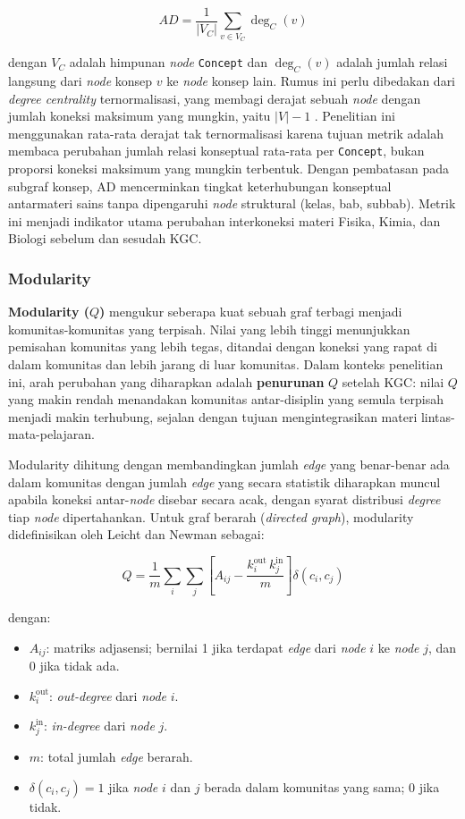 \documentclass[../../thesis]{subfiles}
\begin{document}
\[
  AD = \frac{1}{|V_C|} \sum_{v \in V_C} \deg_C(v)
\]

\noindent dengan $V_C$ adalah himpunan \textit{node} \texttt{Concept} dan
$\deg_C(v)$ adalah jumlah relasi langsung dari \textit{node} konsep $v$ ke
\textit{node} konsep lain. Rumus ini perlu dibedakan dari \textit{degree
centrality} ternormalisasi, yang membagi derajat sebuah \textit{node} dengan
jumlah koneksi maksimum yang mungkin, yaitu $|V|-1$
\parencite{pavel_degree_2022}. Penelitian ini menggunakan rata-rata derajat tak
ternormalisasi karena tujuan metrik adalah membaca perubahan jumlah relasi
konseptual rata-rata per \texttt{Concept}, bukan proporsi koneksi maksimum yang
mungkin terbentuk. Dengan pembatasan pada subgraf konsep, AD mencerminkan
tingkat keterhubungan konseptual antarmateri sains tanpa dipengaruhi
\textit{node} struktural (kelas, bab, subbab). Metrik ini menjadi indikator
utama perubahan interkoneksi materi Fisika, Kimia, dan Biologi sebelum dan
sesudah KGC.

\subsubsection{Modularity}

\textbf{Modularity ($Q$)} mengukur seberapa kuat sebuah graf terbagi
menjadi komunitas-komunitas yang terpisah. Nilai yang lebih tinggi
menunjukkan pemisahan komunitas yang lebih tegas, ditandai dengan koneksi
yang rapat di dalam komunitas dan lebih jarang di luar komunitas. Dalam
konteks penelitian ini, arah perubahan yang diharapkan adalah
\textbf{penurunan} $Q$ setelah KGC: nilai $Q$ yang makin rendah menandakan
komunitas antar-disiplin yang semula terpisah menjadi makin terhubung,
sejalan dengan tujuan mengintegrasikan materi lintas-mata-pelajaran.

Modularity dihitung dengan membandingkan jumlah \textit{edge} yang
benar-benar ada dalam komunitas dengan jumlah \textit{edge} yang secara
statistik diharapkan muncul apabila koneksi antar-\textit{node} disebar secara
acak, dengan syarat distribusi \textit{degree} tiap \textit{node}
dipertahankan. Untuk graf berarah (\textit{directed graph}), modularity
didefinisikan oleh Leicht dan Newman \parencite{leicht_community_2008} sebagai:

\[
  Q = \frac{1}{m} \sum_{i} \sum_{j}
      \left[ A_{ij} - \frac{k_i^{\text{out}} \, k_j^{\text{in}}}{m}
      \right] \delta(c_i, c_j)
\]

\noindent dengan:

\begin{itemize}
  \item $A_{ij}$: matriks adjasensi; bernilai 1 jika terdapat
        \textit{edge} dari \textit{node} $i$ ke \textit{node} $j$, dan 0 jika tidak ada.
  \item $k_i^{\text{out}}$: \textit{out-degree} dari \textit{node} $i$.
  \item $k_j^{\text{in}}$: \textit{in-degree} dari \textit{node} $j$.
  \item $m$: total jumlah \textit{edge} berarah.
  \item $\delta(c_i, c_j) = 1$ jika \textit{node} $i$ dan $j$ berada dalam
        komunitas yang sama; 0 jika tidak.
\end{itemize}
\end{document}
